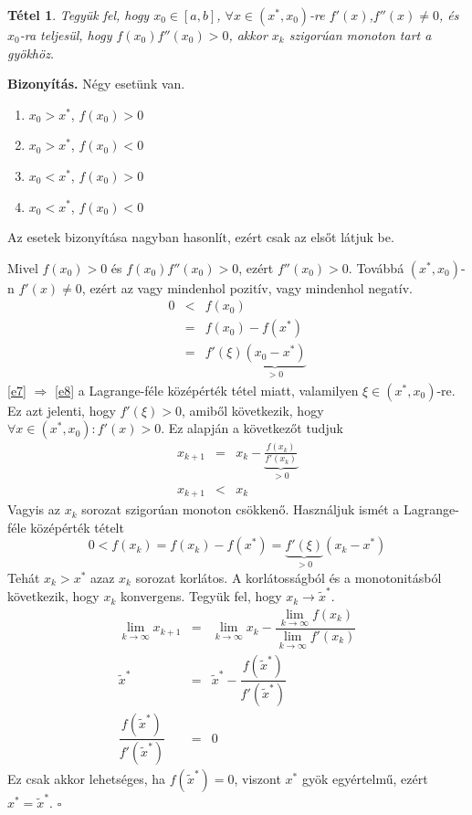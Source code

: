 \documentclass[a4paper,12pt]{report}
\newtheorem{Tet}{Tétel}[section]
\newenvironment{Biz}{\noindent \textbf{Bizonyítás. }}{ $\square$}
\begin{document}
            
            
            
            
            
            
            
            
            
            
            
            
            
            
            
			\begin{Tet}
				\label{t1}
				Tegyük fel, hogy $x_0\in [a,b]$, $\forall x \in (x^*,x_0)$-re $f'(x)$,$f''(x) \neq 0$, és $x_0$-ra teljesül, hogy $f(x_0)f''(x_0)>0$, akkor $x_k$ szigorúan monoton tart a gyökhöz.
			\end{Tet}
			\begin{Biz}
				Négy esetünk van.
				\begin{enumerate}
					\item $x_0>x^*$, $f(x_0)>0$
					\item $x_0>x^*$, $f(x_0)<0$
					\item $x_0<x^*$, $f(x_0)>0$
					\item $x_0<x^*$, $f(x_0)<0$
				\end{enumerate}
				Az esetek bizonyítása nagyban hasonlít, ezért csak az elsőt látjuk be.
                
                Mivel $f(x_0)>0$ és $f(x_0)f''(x_0)>0$, ezért $f''(x_0)>0$. Továbbá $(x^*,x_0)$-n $f'(x)\neq 0$, ezért az vagy mindenhol pozitív, vagy mindenhol negatív. 
				\begin{eqnarray}
					\label{e6}0&<&f(x_0)\\
					\label{e7}&=&f(x_0)-f(x^*)\\
					\label{e8}&=&f'(\xi)\underbrace{(x_0-x^*)}_{>0}
				\end{eqnarray}
				\ref{e7} $\Rightarrow$ \ref{e8} a Lagrange-féle középérték tétel miatt, valamilyen $\xi \in (x^*,x_0)$-re. Ez azt jelenti, hogy $f'(\xi)>0$, amiből következik, hogy $\forall x\in (x^*,x_0): f'(x)>0$. Ez alapján a következőt tudjuk
				\begin{eqnarray*}
					x_{k+1}&=&x_k-\underbrace{\frac{f(x_k)}{f'(x_k)}}_{>0} \\
					x_{k+1}&<&x_k
				\end{eqnarray*}
				Vagyis az $x_k$ sorozat szigorúan monoton csökkenő. Használjuk ismét a Lagrange-féle középérték tételt
				\[0<f(x_k)=f(x_k)-f(x^*)=\underbrace{f'(\xi)}_{>0}(x_k-x^*)\]
				Tehát $x_k>x^*$ azaz $x_k$ sorozat korlátos. A korlátosságból és a monotonitásból következik, hogy $x_k$ konvergens. Tegyük fel, hogy $x_k\to \tilde{x}^*$.
				\begin{eqnarray*}
					\lim_{k \to \infty} x_{k+1} &=& \lim_{k \to \infty} x_k - \dfrac{\lim\limits_{k \to \infty} f(x_k)}{\lim\limits_{k \to \infty} f'(x_k)}\\
					\tilde{x}^*&=&\tilde{x}^*-\dfrac{f(\tilde{x}^*)}{f'(\tilde{x}^*)}\\
					\dfrac{f(\tilde{x}^*)}{f'(\tilde{x}^*)}&=&0
				\end{eqnarray*}
				Ez csak akkor lehetséges, ha $f(\tilde{x}^*)=0$, viszont $x^*$ gyök egyértelmű, ezért $x^*=\tilde{x}^*$.
			\end{Biz}
\end{document}
